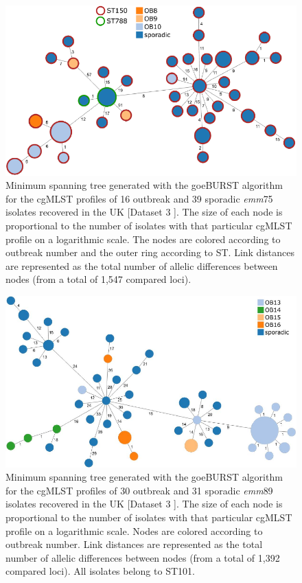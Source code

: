 \newpage
\begin{figure}[h!]
    \centering
    \includegraphics[angle=0,width=\textwidth]{figures/chapter 4/FigureS12.pdf}
    \caption{Minimum spanning tree generated with the goeBURST algorithm for the \ac{cgMLST} profiles of 16 outbreak and 39 sporadic \textit{emm}75 isolates recovered in the UK \cite{coelho_genomic_2019} [Dataset 3 \cite{friaes_supplemental_2023}]. The size of each node is proportional to the number of isolates with that particular \ac{cgMLST} profile on a logarithmic scale. The nodes are colored according to outbreak number and the outer ring according to \ac{ST}. Link distances are represented as the total number of allelic differences between nodes (from a total of 1,547 compared loci).}
    \label{fig:chap4_figureS12}
\end{figure}

\newpage
\begin{figure}[h!]
    \centering
    \includegraphics[angle=0,width=\textwidth]{figures/chapter 4/FigureS13.pdf}
    \caption{Minimum spanning tree generated with the goeBURST algorithm for the \ac{cgMLST} profiles of 30 outbreak and 31 sporadic \textit{emm}89 isolates recovered in the UK \cite{coelho_genomic_2019} [Dataset 3 \cite{friaes_supplemental_2023}]. The size of each node is proportional to the number of isolates with that particular \ac{cgMLST} profile on a logarithmic scale. Nodes are colored according to outbreak number. Link distances are represented as the total number of allelic differences between nodes (from a total of 1,392 compared loci). All isolates belong to \ac{ST}101.}
    \label{fig:chap4_figureS13}
\end{figure}


